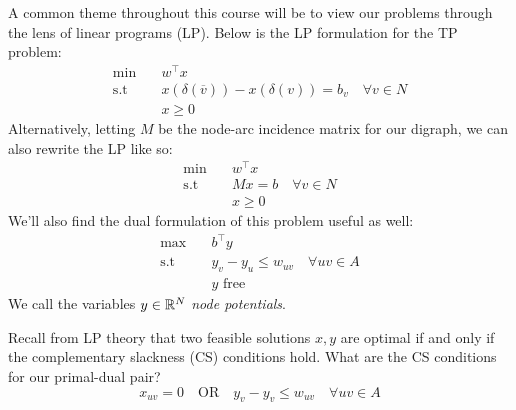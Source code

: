 A common theme throughout this course will be to view our problems through the lens of linear programs (LP). Below is the LP formulation for the TP problem:
\begin{equation}\label{eq:tp_lp-formulation}
\begin{aligned}
  \min \quad &w^\intercal x \\
  \text{s.t} \quad &x(\delta(\overline{v})) - x(\delta(v)) = b_v \quad \forall v \in N \\
  &x \geq 0
\end{aligned}
\end{equation}
Alternatively, letting $M$ be the node-arc incidence matrix for our digraph, we can also rewrite the LP like so:
\begin{align*}
  \min \quad &w^\intercal x \\
  \text{s.t} \quad &Mx = b \quad \forall v \in N \\
  &x \geq 0
\end{align*}
We'll also find the dual formulation of this problem useful as well:
\begin{equation}\label{eq:tp_dual-formulation}
\begin{aligned}
    \max \quad &b^\intercal y \\
    \text{s.t} \quad &y_v - y_u \leq w_{uv} \quad \forall uv \in A \\
    &y \text{ free}
\end{aligned}
\end{equation}
We call the variables $y \in \mathbb{R}^N$ \textit{node potentials}.

Recall from LP theory that two feasible solutions $x, y$ are optimal if and only if the complementary slackness (CS) conditions hold. What are the CS conditions for our primal-dual pair?
\begin{equation}\label{eq:tp_cs-conditions}
  x_{uv} = 0 \quad \text{OR} \quad y_v - y_v \leq w_{uv} \quad \forall uv \in A
\end{equation}


